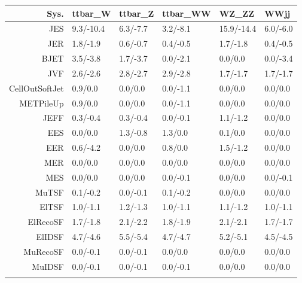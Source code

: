\begin{tabular}{r|p{.08\linewidth}p{.08\linewidth}p{.08\linewidth}p{.08\linewidth}p{.08\linewidth}}
\toprule
 Sys.  & ttbar\_W & ttbar\_Z & ttbar\_WW & WZ\_ZZ & WWjj \\
\toprule
JES  & 9.3/-10.4 & 6.3/-7.7 & 3.2/-8.1 & 15.9/-14.4 & 6.0/-6.0 \\
JER  & 1.8/-1.9 & 0.6/-0.7 & 0.4/-0.5 & 1.7/-1.8 & 0.4/-0.5 \\
BJET  & 3.5/-3.8 & 1.7/-3.7 & 0.0/-2.1 & 0.0/0.0 & 0.0/-3.4 \\
JVF  & 2.6/-2.6 & 2.8/-2.7 & 2.9/-2.8 & 1.7/-1.7 & 1.7/-1.7 \\
CellOutSoftJet  & 0.9/0.0 & 0.0/0.0 & 0.0/-1.1 & 0.0/0.0 & 0.0/0.0 \\
METPileUp  & 0.9/0.0 & 0.0/0.0 & 0.0/-1.1 & 0.0/0.0 & 0.0/0.0 \\
JEFF  & 0.3/-0.4 & 0.3/-0.4 & 0.0/-0.1 & 1.1/-1.2 & 0.0/0.0 \\
EES  & 0.0/0.0 & 1.3/-0.8 & 1.3/0.0 & 0.1/0.0 & 0.0/0.0 \\
EER  & 0.6/-4.2 & 0.0/0.0 & 0.8/0.0 & 1.5/-1.2 & 0.0/0.0 \\
MER  & 0.0/0.0 & 0.0/0.0 & 0.0/0.0 & 0.0/0.0 & 0.0/0.0 \\
MES  & 0.0/0.0 & 0.0/0.0 & 0.0/-0.1 & 0.0/0.0 & 0.0/-0.1 \\
MuTSF  & 0.1/-0.2 & 0.0/-0.1 & 0.1/-0.2 & 0.0/0.0 & 0.0/0.0 \\
ElTSF  & 1.0/-1.1 & 1.2/-1.3 & 1.0/-1.1 & 1.1/-1.2 & 1.0/-1.1 \\
ElRecoSF  & 1.7/-1.8 & 2.1/-2.2 & 1.8/-1.9 & 2.1/-2.1 & 1.7/-1.7 \\
ElIDSF  & 4.7/-4.6 & 5.5/-5.4 & 4.7/-4.7 & 5.2/-5.1 & 4.5/-4.5 \\
MuRecoSF  & 0.0/-0.1 & 0.0/-0.1 & 0.0/0.0 & 0.0/0.0 & 0.0/0.0 \\
MuIDSF  & 0.0/-0.1 & 0.0/-0.1 & 0.0/-0.1 & 0.0/0.0 & 0.0/0.0 \\
 \\
\bottomrule
\end{tabular}
